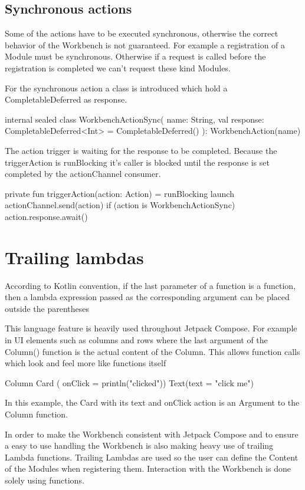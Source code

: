 \subsection{Synchronous actions}
Some of the actions have to be executed synchronous, otherwise the correct behavior of the Workbench is not guaranteed. For example a registration of a Module must be synchronous. Otherwise if a request is called before the registration is completed we can't request these kind Modules. 

For the synchronous action a class is introduced which hold a CompletableDeferred as response.

\begin{kotlincode}
internal sealed class WorkbenchActionSync(
    name: String,
    val response: CompletableDeferred<Int> = CompletableDeferred()
): WorkbenchAction(name) 
\end{kotlincode}

The action trigger is waiting for the response to be completed. Because the triggerAction is runBlocking it's caller is blocked until the response is set completed by the actionChannel consumer.

\begin{kotlincode}
private fun triggerAction(action: Action) = runBlocking {
    launch {
        actionChannel.send(action)
    }
    if (action is WorkbenchActionSync) {
        action.response.await()
    }
}
\end{kotlincode}


\section{Trailing lambdas} \label{Traling_lambdas}

According to Kotlin convention, if the last parameter of a function is a function, then a lambda expression passed as the corresponding argument can be placed outside the parentheses \citep{KotlinLang:TrailingLambdas}

This language feature is heavily used throughout Jetpack Compose. For example in UI elements such as columns and rows where the last argument of the Column() function is the actual content of the Column. This allows function calls which look and feel more like functions itself

\begin{kotlincode}
Column {
    Card ( onClick = { println("clicked")}) {
        Text(text = "click me")
    }
}
\end{kotlincode}

In this example, the Card with its text and onClick action is an Argument to the Column function.

In order to make the Workbench consistent with Jetpack Compose and to ensure a easy to use handling the Workbench is also making heavy use of trailing Lambda functions. Trailing Lambdas are used so the user can define the Content of the Modules when registering them. Interaction with the Workbench is done solely using functions.